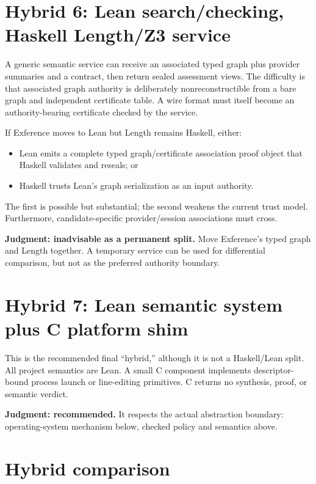 \documentclass[10pt,letterpaper,oneside]{report}
\begin{document}
\section{Hybrid 6: Lean search/checking, Haskell Length/Z3 service}

A generic semantic service can receive an associated typed graph plus provider summaries and a contract, then return sealed assessment views. The difficulty is that associated graph authority is deliberately nonreconstructible from a bare graph and independent certificate table. A wire format must itself become an authority-bearing certificate checked by the service.

If Exference moves to Lean but Length remains Haskell, either:

\begin{itemize}
  \item Lean emits a complete typed graph/certificate association proof object that Haskell validates and reseals; or
  \item Haskell trusts Lean's graph serialization as an input authority.
\end{itemize}

The first is possible but substantial; the second weakens the current trust model. Furthermore, candidate-specific provider/session associations must cross.

\textbf{Judgment: inadvisable as a permanent split.} Move Exference's typed graph and Length together. A temporary service can be used for differential comparison, but not as the preferred authority boundary.

\section{Hybrid 7: Lean semantic system plus C platform shim}

This is the recommended final ``hybrid,'' although it is not a Haskell/Lean split. All project semantics are Lean. A small C component implements descriptor-bound process launch or line-editing primitives. C returns no synthesis, proof, or semantic verdict.

\textbf{Judgment: recommended.} It respects the actual abstraction boundary: operating-system mechanism below, checked policy and semantics above.

\section{Hybrid comparison}
\end{document}
